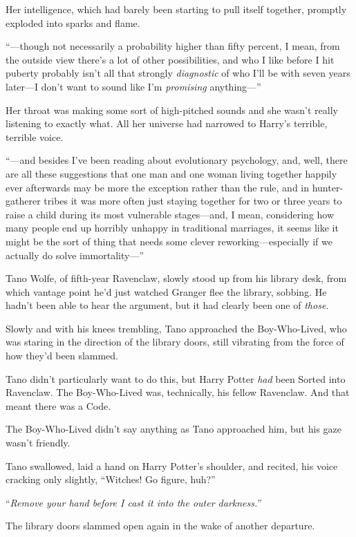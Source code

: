 Her intelligence, which had barely been starting to pull itself together, promptly exploded into sparks and flame.

“—though not necessarily a probability higher than fifty percent, I mean, from the outside view there’s a lot of other possibilities, and who I like before I hit puberty probably isn’t all that strongly \emph{diagnostic} of who I’ll be with seven years later—I don’t want to sound like I’m \emph{promising} anything—”

Her throat was making some sort of high-pitched sounds and she wasn’t really listening to exactly what. All her universe had narrowed to Harry’s terrible, terrible voice.

“—and besides I’ve been reading about evolutionary psychology, and, well, there are all these suggestions that one man and one woman living together happily ever afterwards may be more the exception rather than the rule, and in hunter-gatherer tribes it was more often just staying together for two or three years to raise a child during its most vulnerable stages—and, I mean, considering how many people end up horribly unhappy in traditional marriages, it seems like it might be the sort of thing that needs some clever reworking—especially if we actually do solve immortality—”

\later

Tano Wolfe, of fifth-year Ravenclaw, slowly stood up from his library desk, from which vantage point he’d just watched Granger flee the library, sobbing. He hadn’t been able to hear the argument, but it had clearly been one of \emph{those.}

Slowly and with his knees trembling, Tano approached the Boy-Who-Lived, who was staring in the direction of the library doors, still vibrating from the force of how they’d been slammed.

Tano didn’t particularly want to do this, but Harry Potter \emph{had} been Sorted into Ravenclaw. The Boy-Who-Lived was, technically, his fellow Ravenclaw. And that meant there was a Code.

The Boy-Who-Lived didn’t say anything as Tano approached him, but his gaze wasn’t friendly.

Tano swallowed, laid a hand on Harry Potter’s shoulder, and recited, his voice cracking only slightly, “Witches! Go figure, huh?”

“\emph{Remove your hand before I cast it into the outer darkness.}”

The library doors slammed open again in the wake of another departure.

